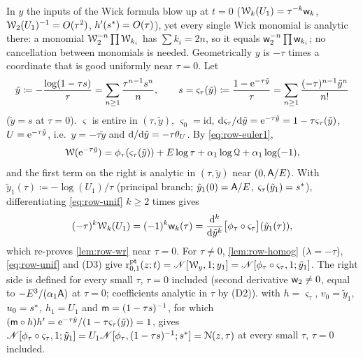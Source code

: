 \begin{rmk}
\label{rmk:row-unif}
In $y$ the inputs of the Wick formula blow up at $t=0$ ($\mathcal{W}_k(U_1)=\tau^{-k}\mathsf{w}_k$, $\mathcal{W}_2(U_1)^{-1}=O(\tau^2)$, $h'(s^{\ast})=O(\tau)$), yet every single Wick monomial is analytic there: a monomial $\mathcal{W}_2^{-n}\prod\mathcal{W}_{k_i}$ has $\sum k_i=2n$, so it equals $\mathsf{w}_2^{-n}\prod\mathsf{w}_{k_i}$; no cancellation between monomials is needed. Geometrically $y$ is $-\tau$ times a coordinate that is good uniformly near $\tau=0$. Let
\[
\tilde y\coloneqq-\frac{\log(1-\tau s)}{\tau}=\sum_{n\geq1}\frac{\tau^{n-1}s^n}{n},\qquad
s=\varsigma_\tau(\tilde y)\coloneqq\frac{1-\mathrm{e}^{-\tau\tilde y}}{\tau}=\sum_{n\geq1}\frac{(-\tau)^{n-1}\tilde y^n}{n!}
\]
($\tilde y=s$ at $\tau=0$). $\varsigma$ is entire in $(\tau,\tilde y)$, $\varsigma_0=\mathrm{id}$, $\mathrm{d}\varsigma_\tau/\mathrm{d}\tilde y=\mathrm{e}^{-\tau\tilde y}=1-\tau\varsigma_\tau(\tilde y)$, $U=\mathrm{e}^{-\tau\tilde y}$, i.e.\ $y=-\tau\tilde y$ and $\mathrm{d}/\mathrm{d}\tilde y=-\tau\theta_{U}$. By \eqref{eq:row-euler1},
\begin{equation}
\label{eq:row-unif}
\mathcal{W}(\mathrm{e}^{-\tau\tilde y})=\phi_\tau(\varsigma_\tau(\tilde y))+E\log\tau+\alpha_1\log\mathcal{Q}+\alpha_1\log(-1),
\end{equation}
and the first term on the right is analytic in $(\tau,\tilde y)$ near $(0,\mathsf{A}/E)$. With $\tilde y_1(\tau)\coloneqq-\log(U_1)/\tau$ (principal branch; $\tilde y_1(0)=\mathsf{A}/E$, $\varsigma_\tau(\tilde y_1)=s^{\ast}$), differentiating \eqref{eq:row-unif} $k\geq2$ times gives
\begin{equation}
\label{eq:row-unif2}
(-\tau)^k\mathcal{W}_k(U_1)=(-1)^k\mathsf{w}_k(\tau)=\frac{\mathrm{d}^k}{\mathrm{d}\tilde y^k}\big[\phi_\tau\circ\varsigma_\tau\big](\tilde y_1(\tau)),
\end{equation}
which re-proves \cref{lem:row-wr} near $\tau=0$. For $\tau\neq0$, \cref{lem:row-homog} ($\lambda=-\tau$), \eqref{eq:row-unif} and (D3) give $\mathrm{r}^{\mathrm{pt}}_{0,1}(z;t)=\mathscr{N}[\mathcal{W}_y,1;y_1]=\mathscr{N}[\phi_\tau\circ\varsigma_\tau,1;\tilde y_1]$. The right side is defined for every small $\tau$, $\tau=0$ included (second derivative $\mathsf{w}_2\neq0$, equal to $-E^3/(\alpha_1\mathsf{A})$ at $\tau=0$; coefficients analytic in $\tau$ by (D2)).  with $h=\varsigma_\tau$, $v_0=\tilde y_1$, $u_0=s^{\ast}$, $h_1=U_1$ and $\mathsf{m}=(1-\tau s)^{-1}$, for which $(\mathsf{m}\circ h)h'=\mathrm{e}^{-\tau\tilde y}/(1-\tau\varsigma_\tau(\tilde y))=1$, gives $\mathscr{N}[\phi_\tau\circ\varsigma_\tau,1;\tilde y_1]=U_1\mathscr{N}[\phi_\tau,(1-\tau s)^{-1};s^{\ast}]=\mathcal{N}(z,\tau)$ at every small $\tau$, $\tau=0$ included.
\end{rmk}

